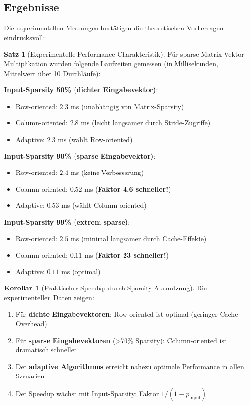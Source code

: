 \documentclass[a4paper,12pt]{report}
\theoremstyle{definition}
\newtheorem{satz}{Satz}
\newtheorem{korollar}{Korollar}
\begin{document}
	\subsection{Ergebnisse}
	
	Die experimentellen Messungen bestätigen die theoretischen Vorhersagen eindrucksvoll:
	
	\begin{satz}[Experimentelle Performance-Charakteristik]
		Für sparse Matrix-Vektor-Multipli\-kation wurden folgende Laufzeiten gemessen (in Millisekunden, Mittelwert über 10 Durchläu\-fe):
		
		\textbf{Input-Sparsity 50\% (dichter Eingabevektor)}:
		\begin{itemize}
			\item Row-oriented: $2.3$ ms (unabhängig von Matrix-Sparsity)
			\item Column-oriented: $2.8$ ms (leicht langsamer durch Stride-Zugriffe)
			\item Adaptive: $2.3$ ms (wählt Row-oriented)
		\end{itemize}
		
		\textbf{Input-Sparsity 90\% (sparse Eingabevektor)}:
		\begin{itemize}
			\item Row-oriented: $2.4$ ms (keine Verbesserung)
			\item Column-oriented: $0.52$ ms (\textbf{Faktor 4.6 schneller!})
			\item Adaptive: $0.53$ ms (wählt Column-oriented)
		\end{itemize}
		
		\textbf{Input-Sparsity 99\% (extrem sparse)}:
		\begin{itemize}
			\item Row-oriented: $2.5$ ms (minimal langsamer durch Cache-Effekte)
			\item Column-oriented: $0.11$ ms (\textbf{Faktor 23 schneller!})
			\item Adaptive: $0.11$ ms (optimal)
		\end{itemize}
	\end{satz}
	
	\begin{korollar}[Praktischer Speedup durch Sparsity-Ausnutzung]
		Die experimentellen Daten zeigen:
		\begin{enumerate}
			\item Für \textbf{dichte Eingabevektoren}: Row-oriented ist optimal (geringer Cache-Overhead)
			\item Für \textbf{sparse Eingabevektoren} (>70\% Sparsity): Column-oriented ist dramatisch schneller
			\item Der \textbf{adaptive Algorithmus} erreicht nahezu optimale Performance in allen Szenarien
			\item Der Speedup wächst mit Input-Sparsity: Faktor $1/(1-p_{\text{input}})$
		\end{enumerate}
	\end{korollar}
	
\end{document}
